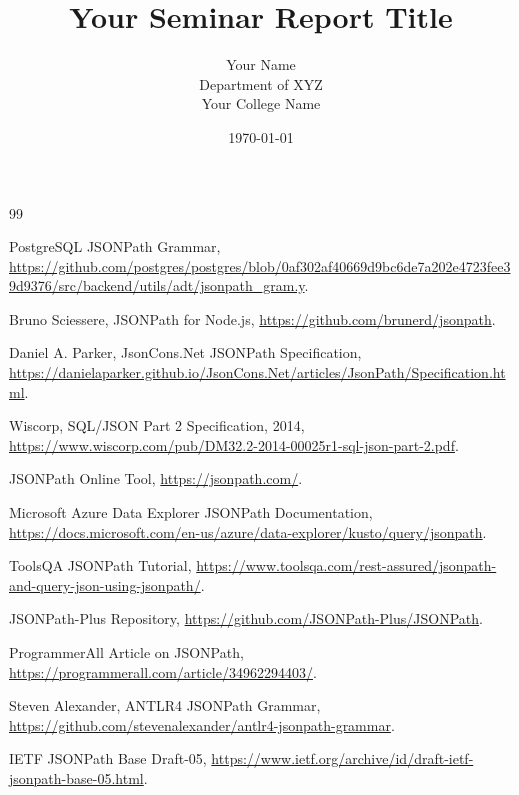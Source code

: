 \documentclass[12pt,a4paper]{report}
\title{Your Seminar Report Title}
\author{Your Name \\ Department of XYZ \\ Your College Name}
\date{\today}
\begin{document}
	
	
	\newpage
	\tableofcontents
	\newpage
	
	
	
	
	
	
	
	
	\newpage
	
	\begin{thebibliography}{99}
		
		PostgreSQL JSONPath Grammar, \url{https://github.com/postgres/postgres/blob/0af302af40669d9bc6de7a202e4723fee39d9376/src/backend/utils/adt/jsonpath_gram.y}.
		
		Bruno Sciessere, JSONPath for Node.js, \url{https://github.com/brunerd/jsonpath}.
		
		Daniel A. Parker, JsonCons.Net JSONPath Specification, \url{https://danielaparker.github.io/JsonCons.Net/articles/JsonPath/Specification.html}.
		
		Wiscorp, SQL/JSON Part 2 Specification, 2014, \url{https://www.wiscorp.com/pub/DM32.2-2014-00025r1-sql-json-part-2.pdf}.
		
		JSONPath Online Tool, \url{https://jsonpath.com/}.
		
		Microsoft Azure Data Explorer JSONPath Documentation, \url{https://docs.microsoft.com/en-us/azure/data-explorer/kusto/query/jsonpath}.
		
		ToolsQA JSONPath Tutorial, \url{https://www.toolsqa.com/rest-assured/jsonpath-and-query-json-using-jsonpath/}.
		
		JSONPath-Plus Repository, \url{https://github.com/JSONPath-Plus/JSONPath}.
		
		ProgrammerAll Article on JSONPath, \url{https://programmerall.com/article/34962294403/}.
		
		Steven Alexander, ANTLR4 JSONPath Grammar, \url{https://github.com/stevenalexander/antlr4-jsonpath-grammar}.
		
		IETF JSONPath Base Draft-05, \url{https://www.ietf.org/archive/id/draft-ietf-jsonpath-base-05.html}.
		

\end{thebibliography}
\end{document}
